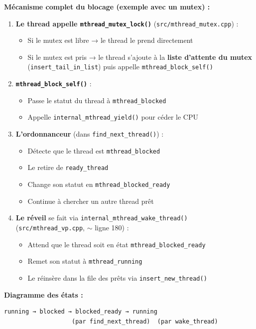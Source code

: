 \documentclass[11pt,a4paper]{article}
\let\oldtexttt\texttt
\renewcommand{\texttt}[1]{\oldtexttt{\color{keyword}#1}}
\begin{document}
\textbf{Mécanisme complet du blocage (exemple avec un mutex) :}
\begin{enumerate}
  \item \textbf{Le thread appelle \texttt{mthread\_mutex\_lock()}} (\texttt{src/mthread\_mutex.cpp}) :
  \begin{itemize}
    \item Si le mutex est libre → le thread le prend directement
    \item Si le mutex est pris → le thread s'ajoute à la \textbf{liste d'attente du mutex} (\texttt{insert\_tail\_in\_list}) puis appelle \texttt{mthread\_block\_self()}
  \end{itemize}

  \item \textbf{\texttt{mthread\_block\_self()}} :
  \begin{itemize}
    \item Passe le statut du thread à \texttt{mthread\_blocked}
    \item Appelle \texttt{internal\_mthread\_yield()} pour céder le CPU
  \end{itemize}

  \item \textbf{L'ordonnanceur} (dans \texttt{find\_next\_thread()}) :
  \begin{itemize}
    \item Détecte que le thread est \texttt{mthread\_blocked}
    \item Le retire de \texttt{ready\_thread}
    \item Change son statut en \texttt{mthread\_blocked\_ready}
    \item Continue à chercher un autre thread prêt
  \end{itemize}

  \item \textbf{Le réveil} se fait via \texttt{internal\_mthread\_wake\_thread()} (\texttt{src/mthread\_vp.cpp}, \(\sim\) ligne 180) :
  \begin{itemize}
    \item Attend que le thread soit en état \texttt{mthread\_blocked\_ready}
    \item Remet son statut à \texttt{mthread\_running}
    \item Le réinsère dans la file des prêts via \texttt{insert\_new\_thread()}
  \end{itemize}
\end{enumerate}

\textbf{Diagramme des états :}
\begin{lstlisting}[language=text]
running → blocked → blocked_ready → running
                   (par find_next_thread)  (par wake_thread)
\end{lstlisting}
\end{document}
